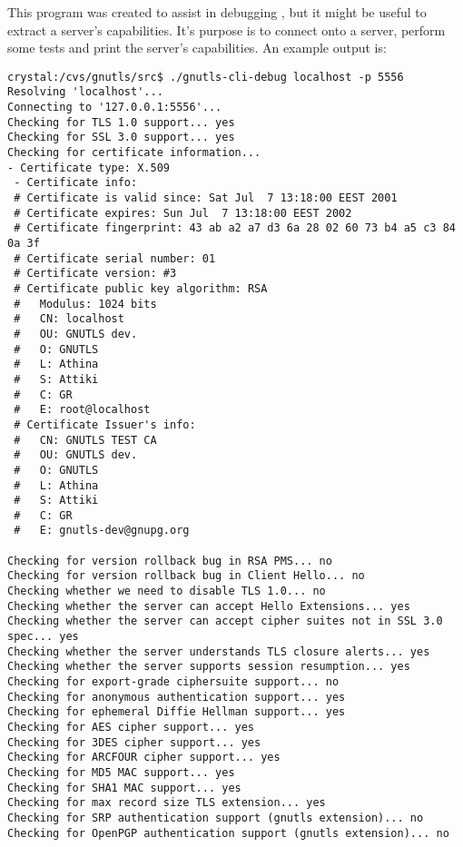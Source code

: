 This program was created to assist in debugging \gnutls{}, but it
might be useful to extract a \tls{} server's capabilities. 
It's purpose is to connect onto a \tls{} server, perform
some tests and print the server's capabilities. An example output is:

\begin{verbatim}
crystal:/cvs/gnutls/src$ ./gnutls-cli-debug localhost -p 5556
Resolving 'localhost'...
Connecting to '127.0.0.1:5556'...
Checking for TLS 1.0 support... yes
Checking for SSL 3.0 support... yes
Checking for certificate information...
- Certificate type: X.509
 - Certificate info:
 # Certificate is valid since: Sat Jul  7 13:18:00 EEST 2001
 # Certificate expires: Sun Jul  7 13:18:00 EEST 2002
 # Certificate fingerprint: 43 ab a2 a7 d3 6a 28 02 60 73 b4 a5 c3 84 0a 3f 
 # Certificate serial number: 01 
 # Certificate version: #3
 # Certificate public key algorithm: RSA
 #   Modulus: 1024 bits
 #   CN: localhost
 #   OU: GNUTLS dev.
 #   O: GNUTLS
 #   L: Athina
 #   S: Attiki
 #   C: GR
 #   E: root@localhost
 # Certificate Issuer's info:
 #   CN: GNUTLS TEST CA
 #   OU: GNUTLS dev.
 #   O: GNUTLS
 #   L: Athina
 #   S: Attiki
 #   C: GR
 #   E: gnutls-dev@gnupg.org
 
Checking for version rollback bug in RSA PMS... no
Checking for version rollback bug in Client Hello... no
Checking whether we need to disable TLS 1.0... no
Checking whether the server can accept Hello Extensions... yes
Checking whether the server can accept cipher suites not in SSL 3.0 spec... yes
Checking whether the server understands TLS closure alerts... yes
Checking whether the server supports session resumption... yes
Checking for export-grade ciphersuite support... no
Checking for anonymous authentication support... yes
Checking for ephemeral Diffie Hellman support... yes
Checking for AES cipher support... yes
Checking for 3DES cipher support... yes
Checking for ARCFOUR cipher support... yes
Checking for MD5 MAC support... yes
Checking for SHA1 MAC support... yes
Checking for max record size TLS extension... yes
Checking for SRP authentication support (gnutls extension)... no
Checking for OpenPGP authentication support (gnutls extension)... no

\end{verbatim}

